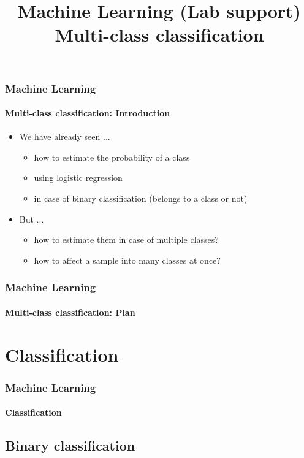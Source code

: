 \documentclass[xcolor=table]{beamer}
\title[ML: Multi-class classification] %
{Machine Learning (Lab support)\\Multi-class classification}
\begin{document}
	
\begin{frame}
	\frametitle{Machine Learning}
	\framesubtitle{Multi-class classification: Introduction}
	
	\begin{itemize}
		\item We have already seen ...
		\begin{itemize}
			\item how to estimate the probability of a class
			\item using logistic regression
			\item in case of binary classification (belongs to a class or not)
		\end{itemize}
		\item But ...
		\begin{itemize}
			\item how to estimate them in case of multiple classes?
			\item how to affect a sample into many classes at once?
		\end{itemize}

	\end{itemize}
\end{frame}


\begin{frame}
	\frametitle{Machine Learning}
	\framesubtitle{Multi-class classification: Plan}
	
	\begin{multicols}{2}
		\tableofcontents
	\end{multicols}
\end{frame}

\section{Classification}

\begin{frame}
	\frametitle{Machine Learning}
	\framesubtitle{Classification}
	
	
\end{frame}

\subsection{Binary classification}
\end{document}
